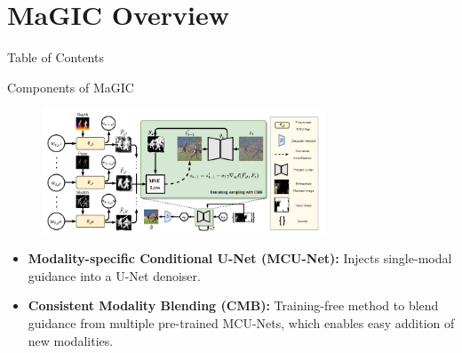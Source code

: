 \documentclass[pdf]{beamer}
\begin{document}
\section{MaGIC Overview}
\begin{frame}{Table of Contents}
    \tableofcontents[currentsection]
\end{frame}

\begin{frame}{Components of MaGIC}
    \begin{figure}
        \centering
        \includegraphics[width=0.75\textwidth]{figures/inference_process.png}
    \end{figure}
    \begin{itemize}
        \item \textbf{Modality-specific Conditional U-Net (MCU-Net):} Injects single-modal guidance into a U-Net denoiser.
        \item \textbf{Consistent Modality Blending (CMB):} Training-free method to blend guidance from multiple pre-trained MCU-Nets, which enables easy addition of new modalities.
    \end{itemize}
\end{frame}
\end{document}
